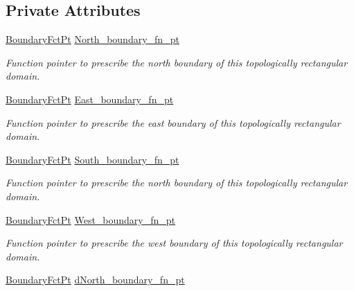 \subsection*{Private Attributes}
\begin{DoxyCompactItemize}
\item 
\hyperlink{classoomph_1_1TopologicallyRectangularDomain_a8b2e24f5500d86c93aef509c5410e7cc}{Boundary\+Fct\+Pt} \hyperlink{classoomph_1_1TopologicallyRectangularDomain_a78adac085b81bd6efed96c43f9c1f8a2}{North\+\_\+boundary\+\_\+fn\+\_\+pt}
\begin{DoxyCompactList}\small\item\em Function pointer to prescribe the north boundary of this topologically rectangular domain. \end{DoxyCompactList}\item 
\hyperlink{classoomph_1_1TopologicallyRectangularDomain_a8b2e24f5500d86c93aef509c5410e7cc}{Boundary\+Fct\+Pt} \hyperlink{classoomph_1_1TopologicallyRectangularDomain_ac6f1166ec8fd2e62704512bfb612dfb4}{East\+\_\+boundary\+\_\+fn\+\_\+pt}
\begin{DoxyCompactList}\small\item\em Function pointer to prescribe the east boundary of this topologically rectangular domain. \end{DoxyCompactList}\item 
\hyperlink{classoomph_1_1TopologicallyRectangularDomain_a8b2e24f5500d86c93aef509c5410e7cc}{Boundary\+Fct\+Pt} \hyperlink{classoomph_1_1TopologicallyRectangularDomain_a48aa6d308f504b63b6f080ed486a1248}{South\+\_\+boundary\+\_\+fn\+\_\+pt}
\begin{DoxyCompactList}\small\item\em Function pointer to prescribe the north boundary of this topologically rectangular domain. \end{DoxyCompactList}\item 
\hyperlink{classoomph_1_1TopologicallyRectangularDomain_a8b2e24f5500d86c93aef509c5410e7cc}{Boundary\+Fct\+Pt} \hyperlink{classoomph_1_1TopologicallyRectangularDomain_ab565242c7de0d10b36ec0a2e7a219bf9}{West\+\_\+boundary\+\_\+fn\+\_\+pt}
\begin{DoxyCompactList}\small\item\em Function pointer to prescribe the west boundary of this topologically rectangular domain. \end{DoxyCompactList}\item 
\hyperlink{classoomph_1_1TopologicallyRectangularDomain_a8b2e24f5500d86c93aef509c5410e7cc}{Boundary\+Fct\+Pt} \hyperlink{classoomph_1_1TopologicallyRectangularDomain_afda00e0273ae8dacbd3626bfd363fcc3}{d\+North\+\_\+boundary\+\_\+fn\+\_\+pt}

\end{DoxyCompactItemize}
